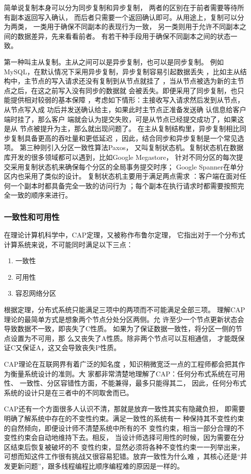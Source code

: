 简单说复制本身可以分为同步复制和异步复制，
两者的区别在于前者需要等待所有副本返回写入确认，
而后者只需要一个返回确认即可。从用途上，复制可以分为两类，
一类用于确保不同副本的表现行为一致，
另一类则用于允许不同副本之间的数据差异，先来看看前者。
有若干种手段用于确保不同副本之间的状态一致。

第一种叫主从复制。主从之间可以是异步复制，也可以是同步复制。
例如MySQL，在默认情况下采用异步复制，异步复制容易引起数据丢失
，比如主从结构中，主节点的写入请求还没有复制到从节点就挂了
，当从节点被选为新的主节点之后，在这之前写入没有同步的数据就
会被丢失。即便采用了同步复制，也只能提供相对较弱的基本保障
，考虑如下情形：主接收写入请求然后发到从节点，从节点写入成
功后并发送确认给主，如果此时主节点正准备发送确
认信息给客户端时挂了，那么客户
端就会认为提交失败，可是从节点已经提交成功了，如果这是从
节点被提升为主，那么就出现问题了。
在主从复制结构里，异步复制相比同步复制具备更高的吞吐量和更低延迟
，因此，结合同步和异步复制是一个常见选项。
第三种则引入分区一致性算法Paxos，
又叫复制状态机。复制状态机在数据
库开发的很多领域都可以遇到，比如Google Megastore，
针对不同分区的每次提交采用复制状态机来确保每个分区的全局事务提交时序；
Google Spanner在单分区内也采用了类似的设计。
复制状态机主要用于满足两点需求
：客户端在面对任何一个副本时都具备完全一致的访问行为
；每个副本在执行请求时都需要按照完全一致的顺序来进行。
\subsubsection{一致性和可用性}
在理论计算机科学中，CAP定理，又被称作布鲁尔定理，
它指出对于一个分布式计算系统来说，不可能同时满足以下三点：
\begin{enumerate}
	\item 一致性
	\item 可用性
	\item 容忍网络分区
\end{enumerate}
根据定理，分布式系统只能满足三项中的两项而不可能满足全部三项。
理解CAP理论的最简单方式是想象两个节点分处分区两侧。允
许至少一个节点更新状态会导致数据不一致，即丧失了C性质。
如果为了保证数据一致性，将分区一侧的节点设置为不可用，那
么又丧失了A性质。除非两个节点可以互相通信，
才能既保证C又保证A，这又会导致丧失P性质。

CAP理论在互联网界有着广泛的知名度
，知识稍微宽泛一点的工程师都会把其作为衡量系统设计的准则。大
家都非常清楚地理解了CAP：任何分布式系统在可用性、
一致性、分区容错性方面，不能兼得，最多只能得其二，
因此，任何分布式系统的设计只是在三者中的不同取舍而已。

CAP还有一个方面很多人认识不清，那就是放弃一致性其实有隐藏负担，
即需要明确了解系统中存在的不变性约束。满足一致性的系统有一
种保持其不变性约束的自然倾向，即便设计师不清楚系统中所有的不
变性约束，相当一部分合理的不变性约束会自动地维持下去。相反，
当设计师选择可用性的时候，因为需要在分区结束后恢复被破坏的不
变性约束，显然必须将各种不变性约束一一列举出来，
可想而知这件工作很有挑战又很容易犯错。放弃一致性为什么难
，其核心还是“并发更新问题”，跟多线程编程比顺序编程难的原因是一样的。
